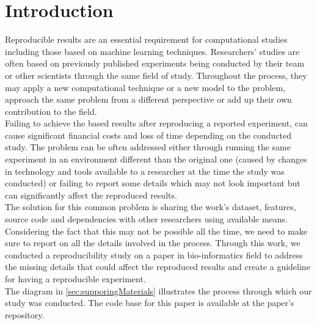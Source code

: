 \section {Introduction}


Reproducible results are an essential requirement for computational studies including those based on machine learning techniques. 
Researchers' studies are often based on previously published experiments being conducted by their team or other scientists 
through the same field of study. 
Throughout the process, they may apply a new computational technique or a new model to the problem, 
approach the same problem from a different perspective or add up their own contribution to the field. \\

Failing to achieve the based results after reproducing a reported experiment, can cause significant financial costs 
and loss of time depending on the conducted study. The problem can be often addressed either through running the same 
experiment in an environment different than the original one (caused by changes in technology and tools available to a 
researcher at the time the study was conducted) or failing to report some details which may not look important but 
can significantly affect the reproduced results. \\

The solution for this common problem is sharing the work's dataset, features, source code and dependencies with other 
researchers using available means. Considering the fact that this may not be possible all the time, we need to make 
sure to report on all the details involved in the process. Through this work, we conducted a reproducibility study on a paper 
in bio-informatics field to address the missing details that could affect the reproduced results and create a guideline for 
having a reproducible experiment.\\

The diagram in \ref{sec:supporingMaterials} illustrates the process through which our study was conducted. The code base for 
this paper is available at the paper's  repository.
